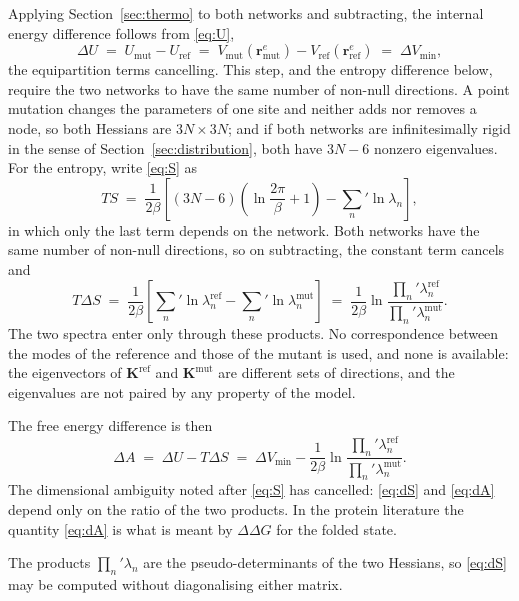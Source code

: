 \documentclass[11pt]{article}
\newcommand{\rr}{\mathbf{r}}
\newcommand{\KK}{\mathbf{K}}
\newcommand{\re}{\rr^{e}}
\begin{document}
Applying Section~\ref{sec:thermo} to both networks and subtracting, the internal
energy difference follows from \eqref{eq:U},
\begin{equation}
\Delta U \;=\; U_{\text{mut}} - U_{\text{ref}}
\;=\; V_{\text{mut}}(\re_{\text{mut}}) - V_{\text{ref}}(\re_{\text{ref}})
\;=\; \Delta V_{\min},
\end{equation}
the equipartition terms cancelling. This step, and the entropy difference below,
require the two networks to have the same number of non-null directions. A point
mutation changes the parameters of one site and neither adds nor removes a node,
so both Hessians are $3N\times3N$; and if both networks are infinitesimally rigid
in the sense of Section~\ref{sec:distribution}, both have $3N-6$ nonzero
eigenvalues. For the entropy, write \eqref{eq:S} as
\begin{equation}
TS \;=\; \frac{1}{2\beta}\left[ (3N-6)\left(\ln\frac{2\pi}{\beta} + 1\right)
- \sum_n{}' \ln \lambda_n \right],
\end{equation}
in which only the last term depends on the network. Both networks have the same
number of non-null directions, so on subtracting, the constant term cancels and
\begin{equation}
\boxed{\;
T \Delta S \;=\; \frac{1}{2\beta}\left[
\sum_n{}' \ln \lambda^{\text{ref}}_n - \sum_n{}' \ln \lambda^{\text{mut}}_n \right]
\;=\; \frac{1}{2\beta} \ln
\frac{\prod_n' \lambda^{\text{ref}}_n}{\prod_n' \lambda^{\text{mut}}_n} .
\;}
\label{eq:dS}
\end{equation}
The two spectra enter only through these products. No correspondence between the
modes of the reference and those of the mutant is used, and none is available:
the eigenvectors of $\KK^{\text{ref}}$ and $\KK^{\text{mut}}$ are different sets of
directions, and the eigenvalues are not paired by any property of the model.

The free energy difference is then
\begin{equation}
\Delta A \;=\; \Delta U - T\Delta S
\;=\; \Delta V_{\min} - \frac{1}{2\beta} \ln
\frac{\prod_n' \lambda^{\text{ref}}_n}{\prod_n' \lambda^{\text{mut}}_n}.
\label{eq:dA}
\end{equation}
The dimensional ambiguity noted after \eqref{eq:S} has cancelled: \eqref{eq:dS} and
\eqref{eq:dA} depend only on the ratio of the two products. In the protein
literature the quantity \eqref{eq:dA} is what is meant by $\Delta\Delta G$ for the
folded state.

The products $\prod_n' \lambda_n$ are the pseudo-determinants of the two Hessians,
so \eqref{eq:dS} may be computed without diagonalising either matrix.
\end{document}
